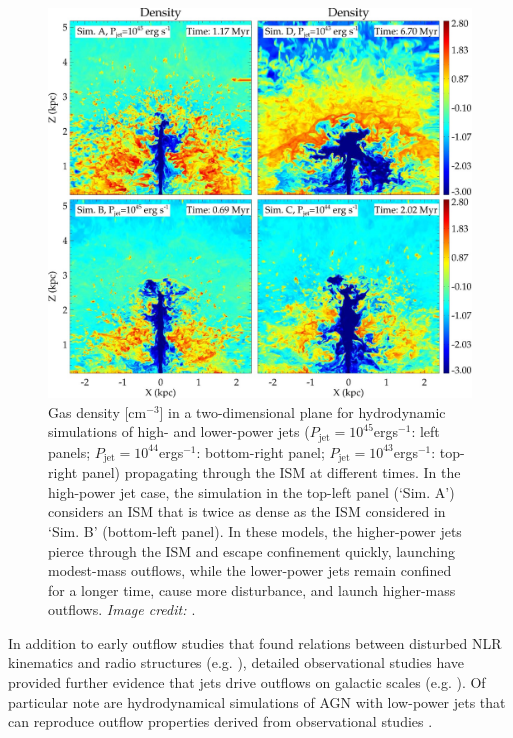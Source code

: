 \begin{figure}
    \centering
    \includegraphics[width=\linewidth]{figures/introduction/mukherjee2016_high_low_power_jets.jpeg}
    \caption[Snapshots of hydrodynamic simulations by \citet{Mukherjee2016} of a higher- and lower-power jet propagating through an ISM.]{Gas density [cm$^{-3}$] in a two-dimensional plane for hydrodynamic simulations of high- and lower-power jets ($P_\mathrm{jet}=10^{45}$\;erg\;s$^{-1}$: left panels; $P_\mathrm{jet}=10^{44}$\;erg\;s$^{-1}$: bottom-right panel; $P_\mathrm{jet}=10^{43}$\;erg\;s$^{-1}$: top-right panel) propagating through the ISM at different times. In the high-power jet case, the simulation in the top-left panel (`Sim. A') considers an ISM that is twice as dense as the ISM considered in `Sim. B' (bottom-left panel). In these models, the higher-power jets pierce through the ISM and escape confinement quickly, launching modest-mass outflows, while the lower-power jets remain confined for a longer time, cause more disturbance, and launch higher-mass outflows. \textit{Image credit: \citet{Mukherjee2016}}.}
    \label{fig: introduction: outflows: acceleration_mechanisms: mukherjee2016_high_low_power_jets}
\end{figure}

In addition to early outflow studies that found relations between disturbed NLR kinematics and radio structures (e.g. \citealt{Wilson1985, Whittle1988}), detailed observational studies have provided further evidence that jets drive outflows on galactic scales (e.g. \citealt{Morganti1998, Morganti2007, Nesvadba2008, Rosario2010a, Rosario2010b, Rosario2010c, Morganti2013_4c1250, Tadhunter2014, Mahony2016, May2017, Audibert2019, May2020, Venturi2021}). Of particular note are hydrodynamical simulations of AGN with low-power jets that can reproduce outflow properties derived from observational studies \citep{Morganti2015, Mukherjee2018, Audibert2023}.

